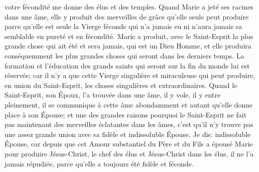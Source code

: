 votre fécondité me donne des élus et des temples.
 Quand Marie a jeté ses racines dans une âme, elle y produit des merveilles de grâce qu'elle seule peut
produire parce qu'elle est seule la Vierge féconde qui n'a jamais eu ni n'aura jamais sa semblable en pureté et en
fécondité.
Marie a produit, avec le Saint-Esprit la plus grande chose qui ait été et sera jamais, qui est un Dieu Homme, et elle
produira conséquemment les plus grandes choses qui seront dans les derniers temps. La formation et l'éducation
des grands saints qui seront sur la fin du monde lui est réservée; car il n'y a que cette Vierge singulière et
miraculeuse qui peut produire, en union du Saint-Esprit, les choses singulières et extraordinaires.
 Quand le Saint-Esprit, son Époux, l'a trouvée dans une âme, il y vole, il y entre pleinement, il se communique
à cette âme abondamment et autant qu'elle donne place à son Épouse; et une des grandes raisons pourquoi le
Saint-Esprit ne fait pas maintenant des merveilles éclatantes dans les âmes, c'est qu'il n'y trouve pas une assez
grande union avec sa fidèle et indissoluble Épouse. Je dis: indissoluble Épouse, car depuis que cet Amour
substantiel du Père et du Fils a épousé Marie pour produire Jésus-Christ, le chef des élus et Jésus-Christ dans les
élus, il ne l'a jamais répudiée, parce qu'elle a toujours été fidèle et féconde.
